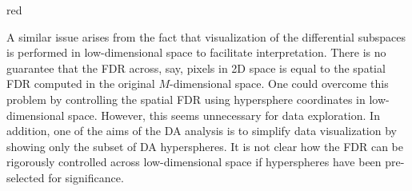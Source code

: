 \documentclass{article}
\begin{document}
\begin{color}{red}

A similar issue arises from the fact that visualization of the differential subspaces is performed in low-dimensional space to facilitate interpretation.
There is no guarantee that the FDR across, say, pixels in 2D space is equal to the spatial FDR computed in the original $M$-dimensional space.
One could overcome this problem by controlling the spatial FDR using hypersphere coordinates in low-dimensional space.
However, this seems unnecessary for data exploration.
In addition, one of the aims of the DA analysis is to simplify data visualization by showing only the subset of DA hyperspheres.
It is not clear how the FDR can be rigorously controlled across low-dimensional space if hyperspheres have been pre-selected for significance.


\end{color}
\end{document}
